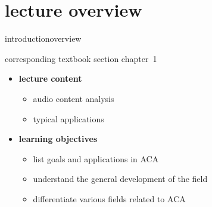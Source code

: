 


\subtitle{module 1.0: introduction to MIR/ACA}


	

    \section[overview]{lecture overview}
        \begin{frame}{introduction}{overview}
            \begin{block}{corresponding textbook section}
                    chapter~1
            \end{block}
            \vspace{5mm}

            \begin{itemize}
                \item   \textbf{lecture content}
                    \begin{itemize}
                        \item   audio content analysis
                        \item   typical applications
                    \end{itemize}
                \bigskip
                \item<2->   \textbf{learning objectives}
                    \begin{itemize}
                        \item   list goals and applications in ACA
                        \item   understand the general development of the field
                        \item   differentiate various fields related to ACA
                    \end{itemize}
            \end{itemize}
        \end{frame}
        
